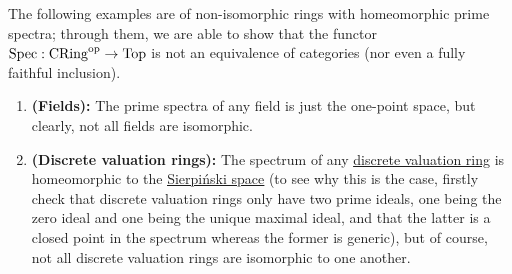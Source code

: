             \begin{example} \label{example: nonisomorphic_rings_with_the_same_spectra}
                The following examples are of non-isomorphic rings with homeomorphic prime spectra; through them, we are able to show that the functor $\operatorname{Spec}: \mathrm{CRing}^{\mathrm{op}} \to \mathrm{Top}$ is not an equivalence of categories (nor even a fully faithful inclusion). 
                \begin{enumerate}
                    \item \textbf{(Fields):} The prime spectra of any field is just the one-point space, but clearly, not all fields are isomorphic.
                    \item \textbf{(Discrete valuation rings):} The spectrum of any \href{https://en.wikipedia.org/wiki/Discrete_valuation_ring}{\underline{discrete valuation ring}} is homeomorphic to the \href{https://ncatlab.org/nlab/show/Sierpinski+space}{\underline{Sierpi\'nski space}} (to see why this is the case, firstly check that discrete valuation rings only have two prime ideals, one being the zero ideal and one being the unique maximal ideal, and that the latter is a closed point in the spectrum whereas the former is generic), but of course, not all discrete valuation rings are isomorphic to one another.
                \end{enumerate}
            \end{example}
        
